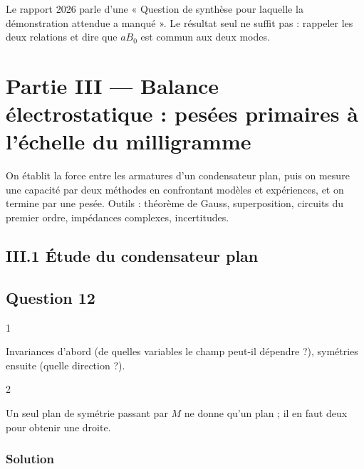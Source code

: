 \documentclass[11pt,a4paper]{article}
\begin{document}
\begin{jury}

Le rapport 2026 parle d'une « Question de synthèse pour laquelle la démonstration attendue a manqué ». Le résultat seul ne suffit pas : rappeler les deux relations et dire que \(aB_0\) est commun aux deux modes.

\end{jury}

\hypertarget{partie-iii-balance-uxe9lectrostatique-pesuxe9es-primaires-uxe0-luxe9chelle-du-milligramme}{%
\section{Partie III --- Balance électrostatique : pesées primaires à l'échelle du milligramme}\label{partie-iii-balance-uxe9lectrostatique-pesuxe9es-primaires-uxe0-luxe9chelle-du-milligramme}}

On établit la force entre les armatures d'un condensateur plan, puis on mesure une capacité par deux méthodes en confrontant modèles et expériences, et on termine par une pesée. Outils : théorème de Gauss, superposition, circuits du premier ordre, impédances complexes, incertitudes.

\hypertarget{iii.1-uxe9tude-du-condensateur-plan}{%
\subsection{III.1 Étude du condensateur plan}\label{iii.1-uxe9tude-du-condensateur-plan}}

\hypertarget{question-12}{%
\subsection{Question 12}\label{question-12}}

\begin{indication}{1}

Invariances d'abord (de quelles variables le champ peut-il dépendre ?), symétries ensuite (quelle direction ?).

\end{indication}

\begin{indication}{2}

Un seul plan de symétrie passant par \(M\) ne donne qu'un plan ; il en faut deux pour obtenir une droite.

\end{indication}

\hypertarget{solution-11}{%
\subsubsection{Solution}\label{solution-11}}
\end{document}
